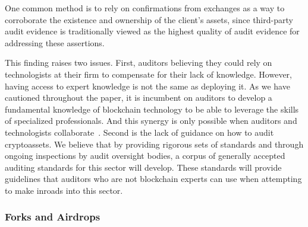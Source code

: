 One common method is to rely on confirmations from exchanges as a way to corroborate the existence and ownership of the client's assets, since third-party audit evidence is traditionally viewed as the highest quality of audit evidence for addressing these assertions. 

This finding raises two issues. First, auditors believing they could rely on technologists at their firm to compensate for their lack of knowledge. However, having access to expert knowledge is not the same as deploying it. As we have cautioned throughout the paper, it is incumbent on auditors to develop a fundamental knowledge of blockchain technology to be able to leverage the skills of specialized professionals. And this synergy is only possible when auditors and technologists collaborate~\cite{bauer2019one}. Second is the lack of guidance on how to audit cryptoassets. We believe that by providing rigorous sets of standards and through ongoing inspections by audit oversight bodies, a corpus of generally accepted auditing standards for this sector will develop. These standards will provide guidelines that auditors who are not blockchain experts can use when attempting to make inroads into this sector. 






\subsubsection{Forks and Airdrops} 

